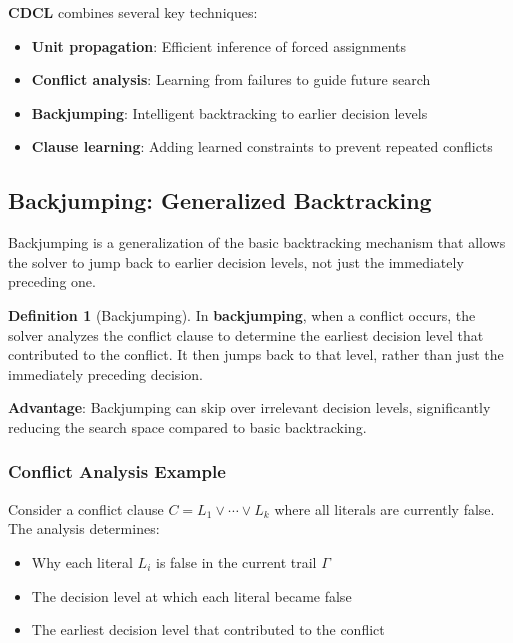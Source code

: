 \documentclass[11pt,a4paper]{article}
\theoremstyle{definition}
\newtheorem{definition}{Definition}[section]
\theoremstyle{plain}
\theoremstyle{remark}
\begin{document}
\begin{tcolorbox}[colback=blue!5!white,colframe=blue!75!black,title=\textbf{CDCL Components}]
\textbf{CDCL} combines several key techniques:
\begin{itemize}
    \item \textbf{Unit propagation}: Efficient inference of forced assignments
    \item \textbf{Conflict analysis}: Learning from failures to guide future search
    \item \textbf{Backjumping}: Intelligent backtracking to earlier decision levels
    \item \textbf{Clause learning}: Adding learned constraints to prevent repeated conflicts
\end{itemize}
\end{tcolorbox}

\subsection{Backjumping: Generalized Backtracking}

Backjumping is a generalization of the basic backtracking mechanism that allows the solver to jump back to earlier decision levels, not just the immediately preceding one.

\begin{tcolorbox}[colback=purple!5!white,colframe=purple!75!black,title=\textbf{Backjumping vs. Backtracking}]
\begin{definition}[Backjumping]
In \textbf{backjumping}, when a conflict occurs, the solver analyzes the conflict clause to determine the earliest decision level that contributed to the conflict. It then jumps back to that level, rather than just the immediately preceding decision.
\end{definition}

\textbf{Advantage}: Backjumping can skip over irrelevant decision levels, significantly reducing the search space compared to basic backtracking.
\end{tcolorbox}

\subsubsection{Conflict Analysis Example}

Consider a conflict clause $C = L_1 \lor \cdots \lor L_k$ where all literals are currently false. The analysis determines:

\begin{itemize}
    \item Why each literal $L_i$ is false in the current trail $\varGamma$
    \item The decision level at which each literal became false
    \item The earliest decision level that contributed to the conflict
\end{itemize}
\end{document}

